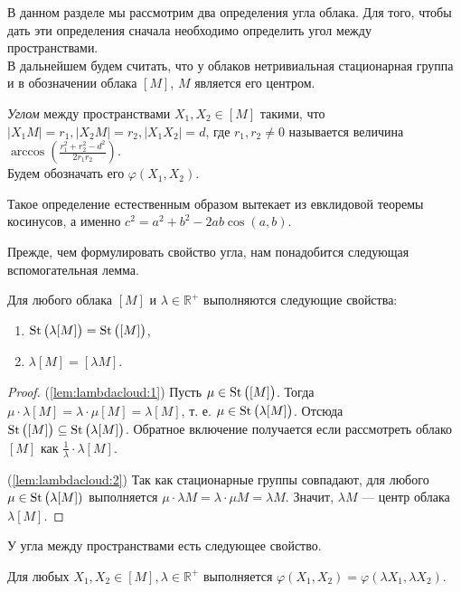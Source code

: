 В данном разделе мы рассмотрим два определения угла облака. Для того, чтобы
дать эти определения сначала необходимо определить угол между пространствами.
\\
В дальнейшем будем считать, что у облаков нетривиальная стационарная группа и в
обозначении облака $ [M] $, $ M $ является его центром.
\begin{defin}
  \emph{Углом} между пространствами $ X_1, X_2 \in [M] $ такими, что $ |X_1
  M| = r_1, | X_2 M | =r_2, |X_1 X_2| = d$, где $ r_1,
  r_2 \neq 0 $ называется величина $ \arccos \left(\frac{r_1^2 +
  r_{2}^2 - d^2}{2r_1r_2} \right)$.\\ Будем обозначать его $
  \varphi(X_1, X_2) $.
\end{defin}
\begin{remark}
  Такое определение естественным образом вытекает из евклидовой теоремы
  косинусов, а именно $ c^{2} = a^2 + b^2 - 2ab\cos (a,b) $.
\end{remark}
Прежде, чем формулировать свойство угла, нам понадобится следующая
вспомогательная лемма.
\begin{lemma}
  \label{lem:lambdacloud} Для любого облака \( [M] \) и \( \lambda
  \in\mathbb{R}^+ \) выполняются следующие свойства{\textup{:}}
  \begin{enumerate}
    \item \( \operatorname{St}\big(\lambda [M]\big) = \operatorname{St}\big([M]\big)\),
      \label{lem:lambdacloud:1}
    \item \( \lambda [M] = [\lambda M] \).\label{lem:lambdacloud:2}
  \end{enumerate}
\end{lemma}
\begin{proof}
    (\ref{lem:lambdacloud:1}) Пусть \( \mu \in \operatorname{St}\big([M]\big) \). Тогда \( \mu
  \cdot \lambda [M] = \lambda \cdot \mu [M]= \lambda [M] \), т. е. \( \mu \in
  \operatorname{St}\big(\lambda [M]\big) \). Отсюда \( \operatorname{St}\big([M]\big) \subseteq
  \operatorname{St}\big(\lambda [M]\big) \). Обратное включение получается если рассмотреть
  облако \( [M] \) как \(\frac{1}{\lambda}\cdot \lambda [M] \).

  (\ref{lem:lambdacloud:2}) Так как стационарные группы совпадают, для любого
  \( \mu \in  \operatorname{St}\big(\lambda [M])\) выполняется \( \mu \cdot \lambda M =
  \lambda \cdot \mu M = \lambda M \). Значит, \( \lambda M \) --- центр
  облака \( \lambda [M] \).
\end{proof}
У угла между пространствами есть следующее свойство.
\begin{lemma}
  \label{lemmaAngleBetweenSpaces} Для любых \( X_1, X_2 \in [M], \lambda
  \in\mathbb{R}^+ \) выполняется \( \varphi (X_1, X_2) = \varphi (\lambda
      X_1,
  \lambda X_2) \).
\end{lemma}
